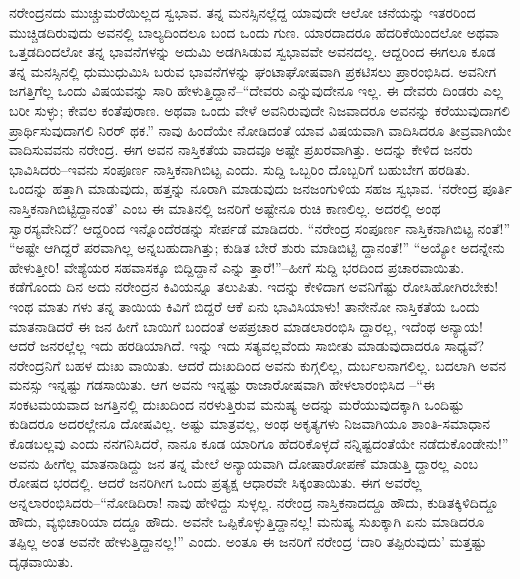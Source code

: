ನರೇಂದ್ರನದು ಮುಚ್ಚುಮರೆಯಿಲ್ಲದ ಸ್ವಭಾವ. ತನ್ನ ಮನಸ್ಸಿನಲ್ಲೆದ್ದ ಯಾವುದೇ ಆಲೋ ಚನೆಯನ್ನು ಇತರರಿಂದ ಮುಚ್ಚಿಡದಿರುವುದು ಅವನಲ್ಲಿ ಬಾಲ್ಯದಿಂದಲೂ ಬಂದ ಒಂದು ಗುಣ. ಯಾರದಾದರೂ ಹೆದರಿಕೆಯಿಂದಲೋ ಅಥವಾ ಒತ್ತಡದಿಂದಲೋ ತನ್ನ ಭಾವನೆಗಳನ್ನು ಅದುಮಿ ಅಡಗಿಸಿಡುವ ಸ್ವಭಾವವೇ ಅವನದಲ್ಲ. ಆದ್ದರಿಂದ ಈಗಲೂ ಕೂಡ ತನ್ನ ಮನಸ್ಸಿನಲ್ಲಿ ಧುಮುಧುಮಿಸಿ ಬರುವ ಭಾವನೆಗಳನ್ನು ಘಂಟಾಘೋಷವಾಗಿ ಪ್ರಕಟಿಸಲು ಪ್ರಾರಂಭಿಸಿದ. ಅವನೀಗ ಜಗತ್ತಿಗೆಲ್ಲ ಒಂದು ವಿಷಯವನ್ನು ಸಾರಿ ಹೇಳುತ್ತಿದ್ದಾನೆ–“ದೇವರು ಎನ್ನುವುದೇನೂ ಇಲ್ಲ. ಈ ದೇವರು ದಿಂಡರು ಎಲ್ಲ ಬರೀ ಸುಳ್ಳು; ಕೇವಲ ಕಂತೆಪುರಾಣ. ಅಥವಾ ಒಂದು ವೇಳೆ ಅವನಿರುವುದೇ ನಿಜವಾದರೂ ಅವನನ್ನು ಕರೆಯುವುದಾಗಲಿ ಪ್ರಾರ್ಥಿಸುವುದಾಗಲಿ ನಿರರ್ ಥಕ.” ನಾವು ಹಿಂದೆಯೇ ನೋಡಿದಂತೆ ಯಾವ ವಿಷಯವಾಗಿ ವಾದಿಸಿದರೂ ತೀವ್ರವಾಗಿಯೇ ವಾದಿಸುವವನು ನರೇಂದ್ರ. ಈಗ ಅವನ ನಾಸ್ತಿಕತೆಯ ವಾದವೂ ಅಷ್ಟೇ ಪ್ರಖರವಾಗಿತ್ತು. ಅದನ್ನು ಕೇಳಿದ ಜನರು ಭಾವಿಸಿದರು–ಇವನು ಸಂಪೂರ್ಣ ನಾಸ್ತಿಕನಾಗಿಬಿಟ್ಟ ಎಂದು. ಸುದ್ದಿ ಒಬ್ಬರಿಂ ದೊಬ್ಬರಿಗೆ ಬಹುಬೇಗ ಹರಡಿತು. ಒಂದನ್ನು ಹತ್ತಾಗಿ ಮಾಡುವುದು, ಹತ್ತನ್ನು ನೂರಾಗಿ ಮಾಡುವುದು ಜನಜಂಗುಳಿಯ ಸಹಜ ಸ್ವಭಾವ. ‘ನರೇಂದ್ರ ಪೂರ್ತಿ ನಾಸ್ತಿಕನಾಗಿಬಿಟ್ಟಿದ್ದಾನಂತೆ’ ಎಂಬ ಈ ಮಾತಿನಲ್ಲಿ ಜನರಿಗೆ ಅಷ್ಟೇನೂ ರುಚಿ ಕಾಣಲಿಲ್ಲ. ಅದರಲ್ಲಿ ಅಂಥ ಸ್ವಾರಸ್ಯವೇನಿದೆ? ಆದ್ದರಿಂದ ಇನ್ನೊಂದೆರಡನ್ನು ಸೇರ್ಪಡೆ ಮಾಡಿದರು. “ನರೇಂದ್ರ ಸಂಪೂರ್ಣ ನಾಸ್ತಿಕನಾಗಿಬಿಟ್ಟ ನಂತೆ!” “ಅಷ್ಟೇ ಆಗಿದ್ದರೆ ಪರವಾಗಿಲ್ಲ ಅನ್ನಬಹುದಾಗಿತ್ತು; ಕುಡಿತ ಬೇರೆ ಶುರು ಮಾಡಿಬಿಟ್ಟಿ ದ್ದಾನಂತೆ!” “ಅಯ್ಯೋ ಅದನ್ನೇನು ಹೇಳುತ್ತೀರಿ! ವೇಶ್ಯೆಯರ ಸಹವಾಸಕ್ಕೂ ಬಿದ್ದಿದ್ದಾನೆ ಎನ್ನು ತ್ತಾರೆ!”–ಹೀಗೆ ಸುದ್ದಿ ಭರದಿಂದ ಪ್ರಚಾರವಾಯಿತು. ಕಡೆಗೊಂದು ದಿನ ಅದು ನರೇಂದ್ರನ ಕಿವಿಯನ್ನೂ ತಲುಪಿತು. ಇದನ್ನು ಕೇಳಿದಾಗ ಅವನಿಗೆಷ್ಟು ರೋಸಿಹೋಗಿರಬೇಕು! ಇಂಥ ಮಾತು ಗಳು ತನ್ನ ತಾಯಿಯ ಕಿವಿಗೆ ಬಿದ್ದರೆ ಆಕೆ ಏನು ಭಾವಿಸಿಯಾಳು! ತಾನೇನೋ ನಾಸ್ತಿಕತೆಯ ಒಂದು ಮಾತನಾಡಿದರೆ ಈ ಜನ ಹೀಗೆ ಬಾಯಿಗೆ ಬಂದಂತೆ ಅಪಪ್ರಚಾರ ಮಾಡಲಾರಂಭಿಸಿ ದ್ದಾರಲ್ಲ, ಇದೆಂಥ ಅನ್ಯಾಯ! ಆದರೆ ಜನರಲ್ಲೆಲ್ಲ ಇದು ಹರಡಿಯಾಗಿದೆ. ಇನ್ನು ಇದು ಸತ್ಯವಲ್ಲವೆಂದು ಸಾಬೀತು ಮಾಡುವುದಾದರೂ ಸಾಧ್ಯವೆ? ನರೇಂದ್ರನಿಗೆ ಬಹಳ ದುಃಖ ವಾಯಿತು. ಆದರೆ ದುಃಖದಿಂದ ಅವನು ಕುಗ್ಗಲಿಲ್ಲ, ದುರ್ಬಲನಾಗಲಿಲ್ಲ. ಬದಲಾಗಿ ಅವನ ಮನಸ್ಸು ಇನ್ನಷ್ಟು ಗಡಸಾಯಿತು. ಆಗ ಅವನು ಇನ್ನಷ್ಟು ರಾಜಾರೋಷವಾಗಿ ಹೇಳಲಾರಂಭಿಸಿದ –“ಈ ಸಂಕಟಮಯವಾದ ಜಗತ್ತಿನಲ್ಲಿ ದುಃಖದಿಂದ ನರಳುತ್ತಿರುವ ಮನುಷ್ಯ ಅದನ್ನು ಮರೆಯುವುದಕ್ಕಾಗಿ ಒಂದಿಷ್ಟು ಕುಡಿದರೂ ಅದರಲ್ಲೇನೂ ದೋಷವಿಲ್ಲ. ಅಷ್ಟು ಮಾತ್ರವಲ್ಲ, ಅಂಥ ಅಕೃತ್ಯಗಳು ನಿಜವಾಗಿಯೂ ಶಾಂತಿ-ಸಮಾಧಾನ ಕೊಡಬಲ್ಲವು ಎಂದು ನನಗನಿಸಿದರೆ, ನಾನೂ ಕೂಡ ಯಾರಿಗೂ ಹೆದರಿಕೊಳ್ಳದೆ ನನ್ನಿಷ್ಟದಂತೆಯೇ ನಡೆದುಕೊಂಡೇನು!” ಅವನು ಹೀಗೆಲ್ಲ ಮಾತನಾಡಿದ್ದು ಜನ ತನ್ನ ಮೇಲೆ ಅನ್ಯಾಯವಾಗಿ ದೋಷಾರೋಪಣೆ ಮಾಡುತ್ತಿ ದ್ದಾರಲ್ಲ ಎಂಬ ರೋಷದ ಭರದಲ್ಲಿ. ಆದರೆ ಜನರಿಗೀಗ ಒಂದು ಪ್ರತ್ಯಕ್ಷ ಆಧಾರವೇ ಸಿಕ್ಕಂತಾಯಿತು. ಈಗ ಅವರೆಲ್ಲ ಅನ್ನಲಾರಂಭಿಸಿದರು–“ನೋಡಿದಿರಾ! ನಾವು ಹೇಳಿದ್ದು ಸುಳ್ಳಲ್ಲ. ನರೇಂದ್ರ ನಾಸ್ತಿಕನಾದದ್ದೂ ಹೌದು, ಕುಡಿತಕ್ಕಿಳಿದಿದ್ದೂ ಹೌದು, ವ್ಯಭಿಚಾರಿಯಾ ದದ್ದೂ ಹೌದು. ಅವನೇ ಒಪ್ಪಿಕೊಳ್ಳುತ್ತಿದ್ದಾನಲ್ಲ! ಮನುಷ್ಯ ಸುಖಕ್ಕಾಗಿ ಏನು ಮಾಡಿದರೂ ತಪ್ಪಿಲ್ಲ ಅಂತ ಅವನೇ ಹೇಳುತ್ತಿದ್ದಾನಲ್ಲ!” ಎಂದು. ಅಂತೂ ಈ ಜನರಿಗೆ ನರೇಂದ್ರ ‘ದಾರಿ ತಪ್ಪಿರುವುದು’ ಮತ್ತಷ್ಟು ದೃಢವಾಯಿತು.


